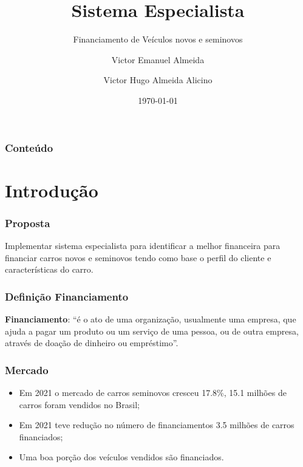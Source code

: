\documentclass[12pt]{beamer}
\author[Victor * Almeida *]{Victor Emanuel Almeida \and Victor Hugo Almeida Alicino}
\title{Sistema Especialista}
\subtitle{Financiamento de Veículos novos e seminovos}
\date{\today}
\institute{UNIOESTE}
\begin{document}
\frame{\titlepage}

\begin{frame}
    \frametitle{Conteúdo}
    \tableofcontents
\end{frame}

\section{Introdução}
\begin{frame}
    \frametitle{Proposta}

    \large Implementar sistema especialista para identificar a melhor financeira para financiar carros novos e seminovos tendo como base o perfil do cliente e características do carro.

\end{frame}

\begin{frame}
    \frametitle{Definição Financiamento}
    \textbf{Financiamento}: ``é o ato de uma organização, usualmente uma empresa, que ajuda a pagar um produto ou um serviço de uma pessoa, ou de outra empresa, através de doação de dinheiro ou empréstimo''\cite{financiamento}.
\end{frame}

\begin{frame}
    \frametitle{Mercado}
    \begin{itemize}
        \item Em 2021 o mercado de carros seminovos cresceu 17.8\%, 15.1 milhões de carros foram vendidos no Brasil\cite{mercado_seminovos};
        \item Em 2021 teve redução no número de financiamentos 3.5 milhões de carros financiados\cite{financiamento_2022};
        \item Uma boa porção dos veículos vendidos são financiados.
    \end{itemize}
\end{frame}
\end{document}
